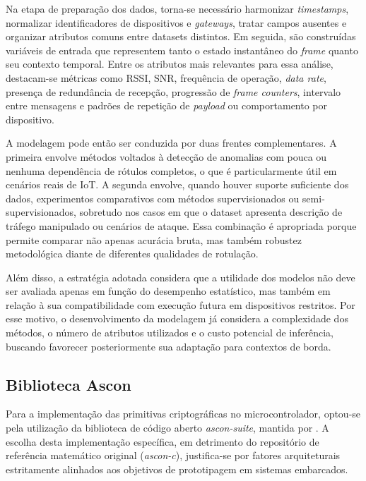 Na etapa de preparação dos dados, torna-se necessário harmonizar \textit{timestamps}, normalizar identificadores de dispositivos e \textit{gateways}, tratar campos ausentes e organizar atributos comuns entre datasets distintos. Em seguida, são construídas variáveis de entrada que representem tanto o estado instantâneo do \textit{frame} quanto seu contexto temporal. Entre os atributos mais relevantes para essa análise, destacam-se métricas como RSSI, SNR, frequência de operação, \textit{data rate}, presença de redundância de recepção, progressão de \textit{frame counters}, intervalo entre mensagens e padrões de repetição de \textit{payload} ou comportamento por dispositivo.

A modelagem pode então ser conduzida por duas frentes complementares. A primeira envolve métodos voltados à detecção de anomalias com pouca ou nenhuma dependência de rótulos completos, o que é particularmente útil em cenários reais de IoT. A segunda envolve, quando houver suporte suficiente dos dados, experimentos comparativos com métodos supervisionados ou semi-supervisionados, sobretudo nos casos em que o dataset apresenta descrição de tráfego manipulado ou cenários de ataque. Essa combinação é apropriada porque permite comparar não apenas acurácia bruta, mas também robustez metodológica diante de diferentes qualidades de rotulação.

Além disso, a estratégia adotada considera que a utilidade dos modelos não deve ser avaliada apenas em função do desempenho estatístico, mas também em relação à sua compatibilidade com execução futura em dispositivos restritos. Por esse motivo, o desenvolvimento da modelagem já considera a complexidade dos métodos, o número de atributos utilizados e o custo potencial de inferência, buscando favorecer posteriormente sua adaptação para contextos de borda. 


\subsection{Biblioteca Ascon}
\label{subsec:biblioteca-ascon}
Para a implementação das primitivas criptográficas no microcontrolador, optou-se pela utilização da biblioteca de código aberto \textit{ascon-suite}, mantida por . A escolha desta implementação específica, em detrimento do repositório de referência matemático original (\textit{ascon-c}), justifica-se por fatores arquiteturais estritamente alinhados aos objetivos de prototipagem em sistemas embarcados.

